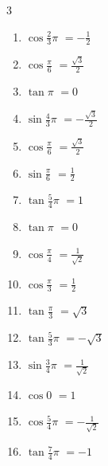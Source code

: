 \begin{multicols}{3}
\begin{enumerate}
  \item $\displaystyle \cos{\frac{2}{3}\pi}$
        $\displaystyle =-\frac{1}{2}$

  \item $\displaystyle \cos{\frac{\pi}{6}}$
        $\displaystyle =\frac{\sqrt{3}}{2}$

  \item $\displaystyle \tan{\pi}$
        $\displaystyle =0$

  \item $\displaystyle \sin{\frac{4}{3}\pi}$
        $\displaystyle =-\frac{\sqrt{3}}{2}$

  \item $\displaystyle \cos{\frac{\pi}{6}}$
        $\displaystyle =\frac{\sqrt{3}}{2}$

  \item $\displaystyle \sin{\frac{\pi}{6}}$
        $\displaystyle =\frac{1}{2}$

  \item $\displaystyle \tan{\frac{5}{4}\pi}$
        $\displaystyle =1$

  \item $\displaystyle \tan{\pi}$
        $\displaystyle =0$

  \item $\displaystyle \cos{\frac{\pi}{4}}$
        $\displaystyle =\frac{1}{\sqrt{2}}$

  \item $\displaystyle \cos{\frac{\pi}{3}}$
        $\displaystyle =\frac{1}{2}$

\columnbreak %

  \item $\displaystyle \tan{\frac{\pi}{3}}$
        $\displaystyle =\sqrt{3}$

  \item $\displaystyle \tan{\frac{5}{3}\pi}$
        $\displaystyle =-\sqrt{3}$

  \item $\displaystyle \sin{\frac{3}{4}\pi}$
        $\displaystyle =\frac{1}{\sqrt{2}}$

  \item $\displaystyle \cos{0}$
        $\displaystyle =1$

  \item $\displaystyle \cos{\frac{5}{4}\pi}$
        $\displaystyle =-\frac{1}{\sqrt{2}}$

  \item $\displaystyle \tan{\frac{7}{4}\pi}$
        $\displaystyle =-1$


\end{enumerate}
\end{multicols}
